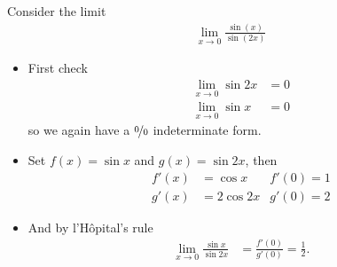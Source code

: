 \begin{eg}\label{eg:hopitalB}
Consider the limit
\begin{align*}
  \lim_{x\to 0} \frac{\sin(x)}{\sin(2x)}
\end{align*}
\begin{itemize}
 \item First check
\begin{align*}
  \lim_{x\to 0} \sin 2x &= 0 \\
  \lim_{x\to 0} \sin x &= 0
\end{align*}
so we again have a $\nicefrac00$ indeterminate form.

\item Set $f(x)=\sin x$ and $g(x)=\sin 2x$, then
\begin{align*}
  f'(x) &= \cos x & f'(0)= 1\\
  g'(x) &= 2\cos 2x & g'(0)= 2
\end{align*}
\item And by l'H\^opital's rule
\begin{align*}
  \lim_{x\to 0} \frac{\sin x}{\sin 2x} &= \frac{f'(0)}{g'(0)} = \frac{1}{2}.
\end{align*}
\end{itemize}
\end{eg}

